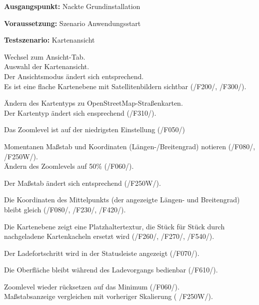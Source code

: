 \documentclass[10pt]{scrreprt}
\newcommand{\sfbf}[1]{\textbf{\sffamily #1}}
\newcommand{\ziel}[1]{{\fontsize{9.5}{11}\textsf{/#1/}}}
\newenvironment{details}[1][6pt]{%
  \parskip#1 \parindent6mm \raggedright%
  \def\item{\par\ignorespaces\hangindent=5mm \hangafter1}}{%
  \par\ignorespaces}
\begin{document}
\vspace{1.0cm}
\begin{details}[2pt]
\item \sfbf{Ausgangspunkt:} Nackte Grundinstallation 
\item \sfbf{Voraussetzung:} Szenario Anwendungsstart
\item \sfbf{Testszenario:} Kartenansicht
\end{details}
\vspace{2mm}
\begin{enumerate}[leftmargin = 2.2cm, resume]
\item Wechsel zum Ansicht-Tab.\\
Auswahl der Kartenansicht.\\Der Ansichtsmodus ändert sich entsprechend.\\
Es ist eine flache Kartenebene mit Satellitenbildern sichtbar (\ziel{F200}, \ziel{F300}).
\item Ändern des Kartentyps zu OpenStreetMap-Straßenkarten.\\Der Kartentyp ändert sich ensprechend (\ziel{F310}).
\item Das Zoomlevel ist auf der niedrigsten Einstellung (\ziel{F050})
\item Momentanen Maßstab und Koordinaten (Längen-/Breitengrad) notieren (\ziel{F080}, \ziel{F250W}).\\Ändern des Zoomlevels auf 50\% (\ziel{F060}).\item Der Maßstab ändert sich entsprechend (\ziel{F250W}).
\item Die Koordinaten des Mittelpunkts (der angezeigte Längen- und Breitengrad) bleibt gleich (\ziel{F080}, \ziel{F230}, \ziel{F420}).
\item Die Kartenebene zeigt eine Platzhaltertextur, die Stück für Stück durch nachgeladene Kartenkacheln ersetzt wird (\ziel{F260}, \ziel{F270}, \ziel{F540}).
\item Der Ladefortschritt wird in der Statusleiste angezeigt (\ziel{F070}). \item Die Oberfläche bleibt während des Ladevorgangs bedienbar (\ziel{F610}).
\item Zoomlevel wieder rücksetzen auf das Minimum (\ziel{F060}).\\ Maßstabsanzeige vergleichen mit vorheriger Skalierung ( \ziel{F250W}).
\end{enumerate}
\end{document}
